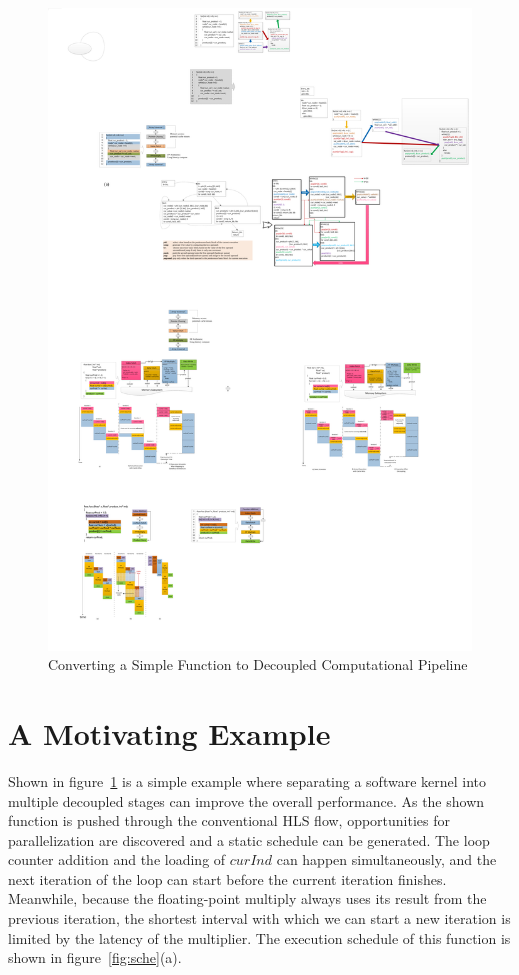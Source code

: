 \begin{figure}[htp]
\begin{center}
\includegraphics[width=0.6\linewidth]{chap3fig/motExample.pdf}
\caption{Converting a Simple Function to Decoupled Computational Pipeline
\label{fig:motivating}}
\end{center}
\end{figure}

\section{A Motivating Example}
\label{motex}
Shown in figure~\ref{fig:motivating} is a simple example where separating a software kernel into multiple decoupled stages can improve the overall performance. As the shown function
is pushed through the conventional HLS flow, opportunities for parallelization are
discovered and a static schedule can be generated. The loop counter addition and the loading of $curInd$ can happen simultaneously, and the next iteration of the  loop
can start before the current iteration finishes. Meanwhile, because the floating-point
multiply always uses its result from the previous iteration, the shortest interval with which we can start a new iteration is limited by the latency
of the multiplier. The execution schedule of this function is shown in figure~\ref{fig:sche}(a).

